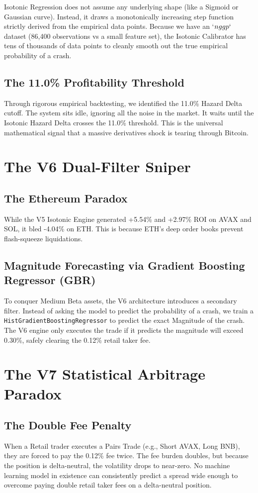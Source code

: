 \documentclass[11pt,a4paper]{report}
\begin{document}
Isotonic Regression does not assume any underlying shape (like a Sigmoid or Gaussian curve). Instead, it draws a monotonically increasing step function strictly derived from the empirical data points. Because we have an `$n \\gg p`$ dataset (86,400 observations vs a small feature set), the Isotonic Calibrator has tens of thousands of data points to cleanly smooth out the true empirical probability of a crash.

\section{The 11.0\% Profitability Threshold}
Through rigorous empirical backtesting, we identified the 11.0\% Hazard Delta cutoff. The system sits idle, ignoring all the noise in the market. It waits until the Isotonic Hazard Delta crosses the 11.0\% threshold. This is the universal mathematical signal that a massive derivatives shock is tearing through Bitcoin. 

\chapter{The V6 Dual-Filter Sniper}
\section{The Ethereum Paradox}
While the V5 Isotonic Engine generated +5.54\% and +2.97\% ROI on AVAX and SOL, it bled -4.04\% on ETH. This is because ETH's deep order books prevent flash-squeeze liquidations. 

\section{Magnitude Forecasting via Gradient Boosting Regressor (GBR)}
To conquer Medium Beta assets, the V6 architecture introduces a secondary filter. Instead of asking the model to predict the probability of a crash, we train a \texttt{HistGradientBoostingRegressor} to predict the exact Magnitude of the crash. 
The V6 engine only executes the trade if it predicts the magnitude will exceed 0.30\%, safely clearing the 0.12\% retail taker fee. 

\chapter{The V7 Statistical Arbitrage Paradox}
\section{The Double Fee Penalty}
When a Retail trader executes a Pairs Trade (e.g., Short AVAX, Long BNB), they are forced to pay the 0.12\% fee twice. The fee burden doubles, but because the position is delta-neutral, the volatility drops to near-zero. No machine learning model in existence can consistently predict a spread wide enough to overcome paying double retail taker fees on a delta-neutral position.
\end{document}
